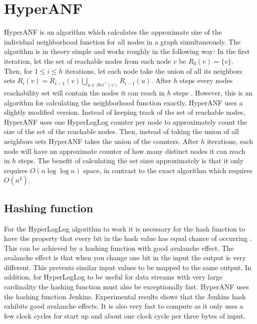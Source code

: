 \section{HyperANF}
HyperANF is an algorithm which calculates the approximate size of the individual neighborhood function for all nodes in a graph simultaneously. The algorithm is in theory simple and works roughly in the following way: In the first iteration, let the set of reachable nodes from each node $v$ be $R_0(v) = \{v\}$. Then, for $1 \leq i \leq h$ iterations, let each node take the union of all its neighbors sets $R_i(v) = R_{i-1}(v) \bigcup\limits_{u \in Nei^+(v)} R_{i-1}(u) $. After $h$ steps every nodes reachability set will contain the nodes it can reach in $h$ steps \cite{hyperball}. However, this is an algorithm for calculating the neighborhood function exactly. HyperANF uses a slightly modified version. Instead of keeping track of the set of reachable nodes, HyperANF uses one HyperLogLog counter per node to approximately count the size of the set of the reachable nodes. Then, instead of taking the union of all neighbors sets HyperANF takes the union of the counters. After $h$ iterations, each node will have an approximate counter of how many distinct nodes it can reach in $h$ steps. The benefit of calculating the set sizes approximately is that it only requires $O(n\log\log n)$ space, in contrast to the exact algorithm which requires $O(n^2)$.


\subsection{Hashing function}
For the HyperLogLog algorithm to work it is necessary for the hash function to have the property that every bit in the hash value has equal chance of occurring \cite{hyperloglog}. This can be achieved by a hashing function with good avalanche effect. The avalanche effect is that when you change one bit in the input the output is very different. This prevents similar input values to be mapped to the same output. In addition, for HyperLogLog to be useful for data streams with very large cardinality the hashing function must also be exceptionally fast. HyperANF uses the hashing function Jenkins. Experimental results shows that the Jenkins hash exhibits good avalanche effects. It is also very fast to compute as it only uses a few clock cycles for start up and about one clock cycle per three bytes of input.

\iffalse
\subsection{BroadWord}
Broadword is a way to do several calculations at the same time using cleverly constructed binary-logic expressions. HyperANF uses broadword to take the union $U$ of two HyperLogLog counters $A$ and $B$, which effectively is taking $\forall i; U_i = max(A_i,B_i)$
\fi


